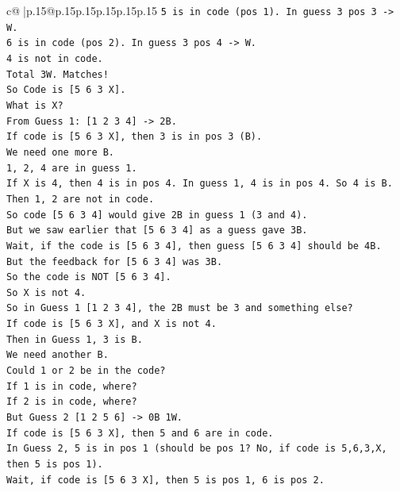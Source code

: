 \documentclass{article}
\begin{document}
{\begin{supertabular}{c@{$\;$}|p{.15\linewidth}@{}p{.15\linewidth}p{.15\linewidth}p{.15\linewidth}p{.15\linewidth}p{.15\linewidth}}
{{{\texttt{5 is in code (pos 1). In guess 3 pos 3 {-}> W.} \\
\texttt{6 is in code (pos 2). In guess 3 pos 4 {-}> W.} \\
\texttt{4 is not in code.} \\
\texttt{Total 3W. Matches!} \\
\texttt{So Code is {[}5 6 3 X{]}.} \\
\texttt{What is X?} \\
\texttt{From Guess 1: {[}1 2 3 4{]} {-}> 2B.} \\
\texttt{If code is {[}5 6 3 X{]}, then 3 is in pos 3 (B).} \\
\texttt{We need one more B.} \\
\texttt{1, 2, 4 are in guess 1.} \\
\texttt{If X is 4, then 4 is in pos 4. In guess 1, 4 is in pos 4. So 4 is B.} \\
\texttt{Then 1, 2 are not in code.} \\
\texttt{So code {[}5 6 3 4{]} would give 2B in guess 1 (3 and 4).} \\
\texttt{But we saw earlier that {[}5 6 3 4{]} as a guess gave 3B.} \\
\texttt{Wait, if the code is {[}5 6 3 4{]}, then guess {[}5 6 3 4{]} should be 4B.} \\
\texttt{But the feedback for {[}5 6 3 4{]} was 3B.} \\
\texttt{So the code is NOT {[}5 6 3 4{]}.} \\
\texttt{So X is not 4.} \\
\texttt{So in Guess 1 {[}1 2 3 4{]}, the 2B must be 3 and something else?} \\
\texttt{If code is {[}5 6 3 X{]}, and X is not 4.} \\
\texttt{Then in Guess 1, 3 is B.} \\
\texttt{We need another B.} \\
\texttt{Could 1 or 2 be in the code?} \\
\texttt{If 1 is in code, where?} \\
\texttt{If 2 is in code, where?} \\
\texttt{But Guess 2 {[}1 2 5 6{]} {-}> 0B 1W.} \\
\texttt{If code is {[}5 6 3 X{]}, then 5 and 6 are in code.} \\
\texttt{In Guess 2, 5 is in pos 1 (should be pos 1? No, if code is 5,6,3,X, then 5 is pos 1).} \\
\texttt{Wait, if code is {[}5 6 3 X{]}, then 5 is pos 1, 6 is pos 2.} \\
}}}
\end{supertabular}}
\end{document}
